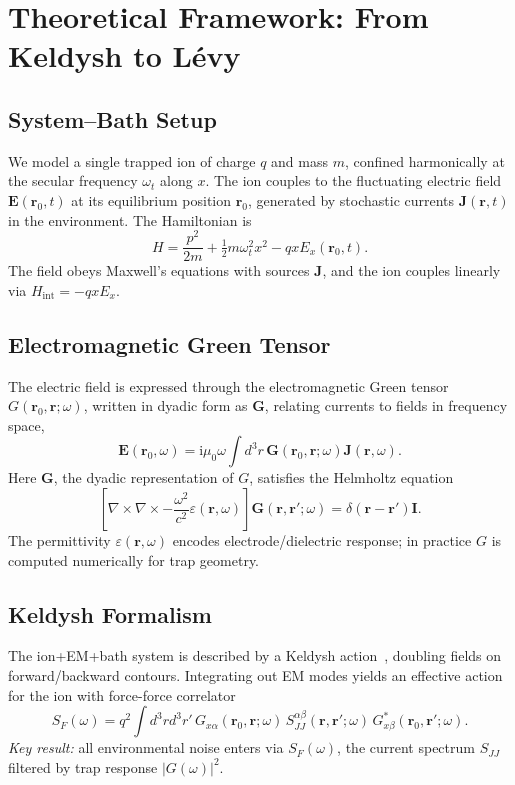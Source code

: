 \section{Theoretical Framework: From Keldysh to Lévy}
\label{sec:theory_foundations}

\subsection{System--Bath Setup}
We model a single trapped ion of charge $q$ and mass $m$, confined harmonically at the secular frequency $\omega_t$ along $x$.
The ion couples to the fluctuating electric field $\mathbf{E}(\mathbf{r}_0,t)$ at its equilibrium position $\mathbf{r}_0$, generated by stochastic currents $\mathbf{J}(\mathbf{r},t)$ in the environment.
The Hamiltonian is
\begin{equation}
H = \frac{p^2}{2m} + \tfrac{1}{2} m \omega_t^2 x^2 - q x E_x(\mathbf{r}_0,t).
\end{equation}
The field obeys Maxwell's equations with sources $\mathbf{J}$, and the ion couples linearly via $H_{\text{int}} = -q x E_x$.

\subsection{Electromagnetic Green Tensor}
The electric field is expressed through the electromagnetic Green tensor $G(\mathbf{r}_0,\mathbf{r};\omega)$, written in dyadic form as $\mathbf{G}$, relating currents to fields in frequency space,
\begin{equation}
\mathbf{E}(\mathbf{r}_0,\omega) = \mathrm{i}\mu_0 \omega \int d^3r\, \mathbf{G}(\mathbf{r}_0,\mathbf{r};\omega) \mathbf{J}(\mathbf{r},\omega).
\end{equation}
Here $\mathbf{G}$, the dyadic representation of $G$, satisfies the Helmholtz equation
\begin{equation}
\left[\nabla\times\nabla\times - \frac{\omega^2}{c^2}\varepsilon(\mathbf{r},\omega)\right]\mathbf{G}(\mathbf{r},\mathbf{r}';\omega) = \delta(\mathbf{r}-\mathbf{r}')\mathbf{I}.
\end{equation}
The permittivity $\varepsilon(\mathbf{r},\omega)$ encodes electrode/dielectric response; in practice $G$ is computed numerically for trap geometry.

\subsection{Keldysh Formalism}
The ion+EM+bath system is described by a Keldysh action~\cite{Kamenev2011}, doubling fields on forward/backward contours.
Integrating out EM modes yields an effective action for the ion with force-force correlator
\begin{equation}
S_F(\omega) = q^2 \int d^3r d^3r'\, G_{x\alpha}(\mathbf{r}_0,\mathbf{r};\omega)\, S_{JJ}^{\alpha\beta}(\mathbf{r},\mathbf{r}';\omega)\, G^*_{x\beta}(\mathbf{r}_0,\mathbf{r}';\omega).
\label{eq:SF}
\end{equation}
\textit{Key result:} all environmental noise enters via $S_F(\omega)$, the current spectrum $S_{JJ}$ filtered by trap response $|G(\omega)|^2$.

